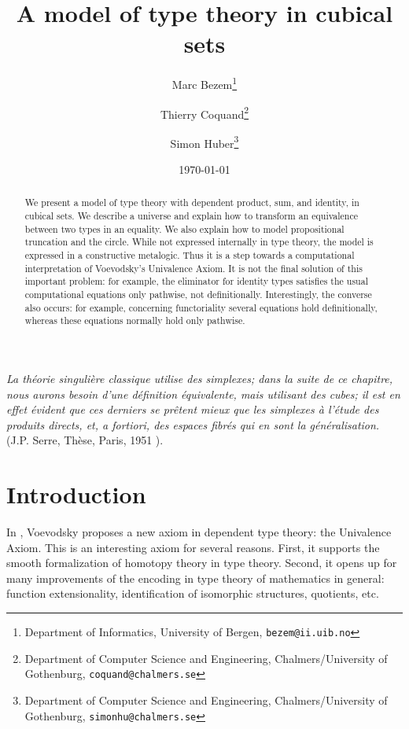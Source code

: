 \documentclass[10pt,a4paper]{article}
\begin{document}
\title{A model of type theory in cubical sets}

\author{
Marc Bezem\thanks{Department of Informatics, University of Bergen, {\tt bezem@ii.uib.no}}
\and
Thierry Coquand\thanks{Department of Computer Science and Engineering, Chalmers/University of Gothenburg, {\tt coquand@chalmers.se}}
\and
Simon Huber\thanks{Department of Computer Science and Engineering, Chalmers/University of Gothenburg, {\tt simonhu@chalmers.se}}
}
\date{\today}
\maketitle


{\em La th\'eorie singuli\`ere classique utilise des {\em simplexes}; dans la suite de ce chapitre,
nous aurons besoin d'une d\'efinition
\'equivalente, mais utilisant des {\em cubes}; il est en effet \'evident que ces derniers se pr\^etent mieux que les
simplexes \`a l'\'etude des produits directs, et, a fortiori, des espaces fibr\'es qui en sont la g\'en\'eralisation.}
(J.P. Serre, Th\`ese, Paris, 1951 \cite{Serre}).


\begin{abstract}\noindent
We present a model of type theory with dependent product, sum, and identity, in cubical sets.
We describe a universe and explain how to transform an equivalence between two types in an equality. 
We also explain how to model propositional truncation and the circle.
While not expressed internally in type theory, the model is expressed in a constructive metalogic.
Thus it is a step towards a computational interpretation of Voevodsky's Univalence Axiom.
It is not the final solution of this important problem: for example, the eliminator for identity types
satisfies the usual computational equations only pathwise, not definitionally.
Interestingly, the converse also occurs: for example, concerning functoriality several equations
hold definitionally, whereas these equations normally hold only pathwise.
\end{abstract}

\section*{Introduction}

In \cite{Voevodsky}, Voevodsky proposes a new axiom in dependent type theory:
the Univalence Axiom. This is an interesting axiom for several reasons.
First, it supports the smooth formalization of homotopy theory in type theory.
Second, it opens up for many improvements of the encoding in type theory
of mathematics in general: function extensionality, identification of isomorphic
structures, quotients, etc.
\end{document}
